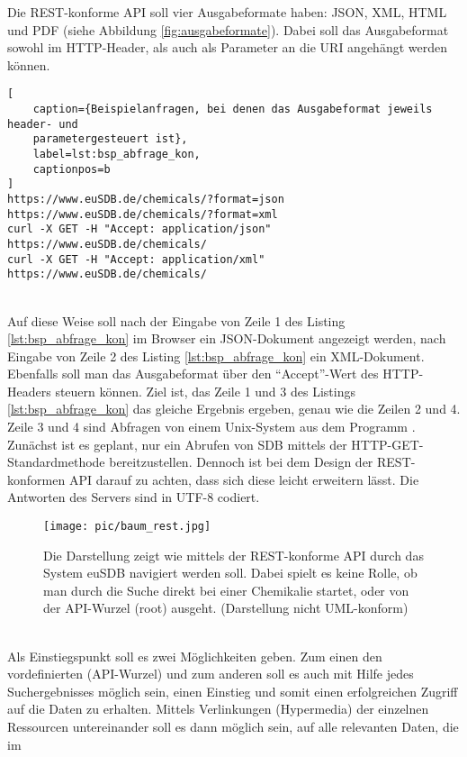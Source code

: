 Die \ac{REST}-konforme \ac{API} soll vier Ausgabeformate haben: \ac{JSON}, \ac{XML},
\ac{HTML} und \ac{PDF} (siehe Abbildung \ref{fig:ausgabeformate}). Dabei
soll das Ausgabeformat sowohl im \ac{HTTP}-Header, als auch als Parameter an die
\ac{URI} angehängt werden können. 
\begin{lstlisting}[
    caption={Beispielanfragen, bei denen das Ausgabeformat jeweils header- und
    parametergesteuert ist},
    label=lst:bsp_abfrage_kon,
    captionpos=b
]
https://www.euSDB.de/chemicals/?format=json 
https://www.euSDB.de/chemicals/?format=xml
curl -X GET -H "Accept: application/json" https://www.euSDB.de/chemicals/
curl -X GET -H "Accept: application/xml" https://www.euSDB.de/chemicals/
\end{lstlisting}
\\
Auf diese Weise soll nach der Eingabe von Zeile 1 des Listing
\ref{lst:bsp_abfrage_kon} im Browser ein \ac{JSON}-Dokument angezeigt
werden, nach Eingabe von Zeile 2 des Listing \ref{lst:bsp_abfrage_kon} ein
\ac{XML}-Dokument. Ebenfalls soll man das Ausgabeformat über den "`Accept"'-Wert
des \ac{HTTP}-Headers steuern können. Ziel ist, das Zeile 1 und 3 des
Listings \ref{lst:bsp_abfrage_kon} das gleiche Ergebnis ergeben, genau wie die
Zeilen 2 und 4. Zeile 3 und 4 sind Abfragen von einem Unix-System aus dem Programm
.
\\
Zunächst ist es geplant, nur ein Abrufen von \ac{SDB} mittels der
\ac{HTTP}-GET-Standardmethode bereitzustellen. Dennoch ist bei dem Design der
\ac{REST}-konformen \ac{API} darauf zu achten, dass sich diese leicht erweitern
lässt. Die Antworten des Servers sind in \ac{UTF-8} codiert.
\begin{figure}[h]
  \centering
    \texttt{[image: pic/baum\_rest.jpg]}
      \caption[Navigationsübersicht durch die REST-konforme API]{Die Darstellung
      zeigt wie mittels der REST-konforme API durch das System euSDB navigiert
      werden soll. Dabei spielt es keine Rolle, ob man durch die Suche direkt
      bei einer Chemikalie startet, oder von der API-Wurzel (root) ausgeht.
      (Darstellung nicht UML-konform)}
      \label{fig:baum_rest}
\end{figure}
\\
Als Einstiegspunkt soll es zwei Möglichkeiten geben. Zum einen den
vordefinierten (\ac{API}-Wurzel) und zum anderen soll es auch mit Hilfe jedes
Suchergebnisses möglich sein, einen Einstieg und somit einen erfolgreichen
Zugriff auf die Daten zu erhalten. Mittels Verlinkungen (Hypermedia) der
einzelnen Ressourcen untereinander soll es dann möglich sein, auf alle relevanten Daten, die im
